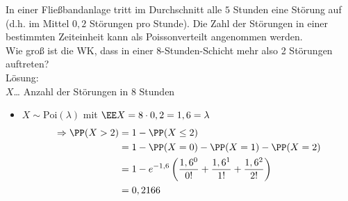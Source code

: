  In einer Fließbandanlage tritt im Durchschnitt alle $5$ Stunden eine Störung auf (d.h. im Mittel $0,2$ Störungen pro Stunde). Die Zahl der Störungen in einer bestimmten Zeiteinheit kann als Poissonverteilt angenommen werden.\\
Wie groß ist die WK, dass in einer 8-Stunden-Schicht mehr also 2 Störungen auftreten?\\
Lösung:\\
$X$… Anzahl der Störungen in 8 Stunden
\begin{itemize}
\item $X\sim \mathrm{Poi}(\lambda)$ mit $\EE X = 8 \cdot 0,2 = 1,6 = \lambda$
\begin{align*}
\Rightarrow \PP(X >2) &= 1- \PP(X\leq 2) \\
&= 1- \PP(X=0) - \PP(X=1) - \PP(X=2)\\
&= 1-e^{-1,6}\left(\frac{1,6^0}{0!}+\frac{1,6^1}{1!}+\frac{1,6^2}{2!}\right)\\
&= 0,2166
\end{align*}
\end{itemize}



